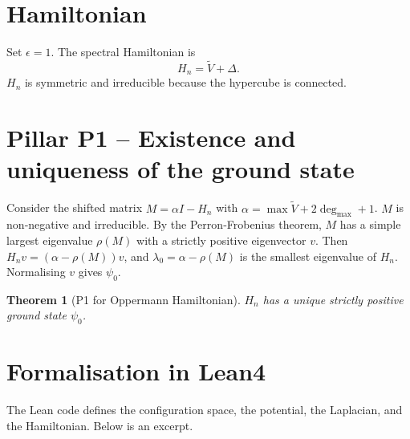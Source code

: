 \documentclass[11pt,a4paper]{article}
\newtheorem{theorem}{Theorem}[section]
\begin{document}
\section{Hamiltonian}

Set $\epsilon = 1$. The spectral Hamiltonian is
\[
H_n = \tilde{V} + \Delta.
\]
$H_n$ is symmetric and irreducible because the hypercube is connected.

\section{Pillar P1 – Existence and uniqueness of the ground state}

Consider the shifted matrix $M = \alpha I - H_n$ with $\alpha = \max \tilde{V} + 2\deg_{\max}+1$. $M$ is non‑negative and irreducible. By the Perron‑Frobenius theorem, $M$ has a simple largest eigenvalue $\rho(M)$ with a strictly positive eigenvector $v$. Then $H_n v = (\alpha - \rho(M)) v$, and $\lambda_0 = \alpha - \rho(M)$ is the smallest eigenvalue of $H_n$. Normalising $v$ gives $\psi_0$.

\begin{theorem}[P1 for Oppermann Hamiltonian]
$H_n$ has a unique strictly positive ground state $\psi_0$.
\end{theorem}

\section{Formalisation in Lean4}

The Lean code defines the configuration space, the potential, the Laplacian, and the Hamiltonian. Below is an excerpt.
\end{document}
